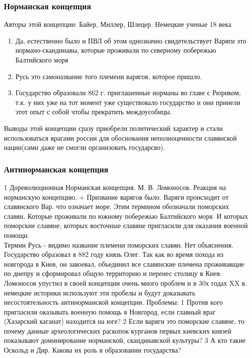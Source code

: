 \documentclass[a4paper]{article}
\begin{document}
\subsubsection{Норманская концепция}
Авторы этой концепции: Байер, Миллер, Шлецер. Немецкие ученые 18 века
\begin{enumerate}
\item Да, естественно было и ПВЛ об этом однозначно свидетельствует
Варяги это нормано-скандинавы, которые проживали по северному побережью Балтийского моря
\item Русь это самоназвание того племени варягов, которое пришло.
\item Государство образовали 862 г. приглашенные норманы во главе с Рюриком, т.к. у них уже на тот момент уже существовало государство и они принели этот опыт с собой чтобы прекратить междоусобицы.
\end{enumerate}
Выводы этой концепции сразу приобрели политический характер и стали использоваться врагами россии для обоснования неполноценности славянской нации(сами даже не смогли организовать государсво).

\subsubsection{Антинорманская концепция}
1   Дореволюционная Норманская концепция. М. В. Ломоносов.
    Реакция на норманскую концепцию. 
    + Призвание варягов было. Варяги происходит от славянского Вар. что означает море. Этим термином обозначали поморских славян. Которые проживали по южному побережью Балтийского моря. И которых поморские славяне, которых восточные славяне пригласили для оказания военной помощи. \\
    Термин Русь - видимо название племени поморских славян. Нет объяснения. \\
    Государство образовал в 882 году князь Олег. Так как во время похода из новгорода в Киев, он завоевал, объединил все славянские племена проживавщие по днепру и сформировал общую территорию и перенес столицу в Киев.
    Ломоносов упустил в своей концепции очень много проблем и в 30х годах XX в. немецкие историки используют эти пробелы и будут доказывать несостоятельность антинорманской концепции.
    Проблемы: 
        1 Против кого пригласили оказывать военную помощь в Новгород, если главный враг (Хазарский каганат) находится на юге?
        2 Если варяги это поморские славяне, то почему данные археологических раскопок курганов первых киевских князей показывают доминирование норманской, скандинавской культуры?
        3 А кто такие Оскольд и Дир. Какова их роль в образовании государства?
\end{document}
